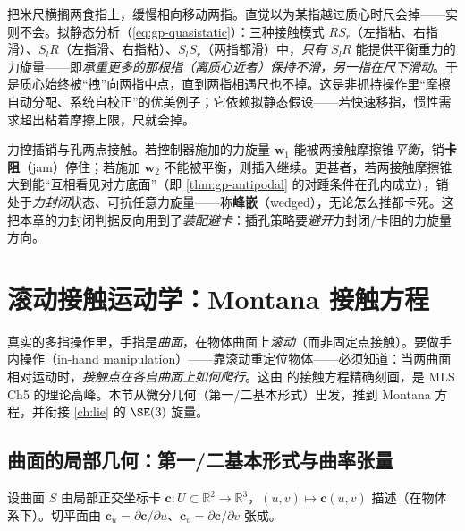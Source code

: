 \begin{example}\label{ex:gp-meterstick}
把米尺横搁两食指上，缓慢相向移动两指。直觉以为某指越过质心时尺会掉——实则不会。拟静态分析（\cref{eq:gp-quasistatic}）：三种接触模式 $RS_r$（左指粘、右指滑）、$S_lR$（左指滑、右指粘）、$S_lS_r$（两指都滑）中，\emph{只有 $S_lR$} 能提供平衡重力的力旋量——即\emph{承重更多的那根指（离质心近者）保持不滑，另一指在尺下滑动}。于是质心始终被“拽”向两指中点，直到两指相遇尺也不掉。这是非抓持操作里“摩擦自动分配、系统自校正”的优美例子；它依赖拟静态假设——若快速移指，惯性需求超出粘着摩擦上限，尺就会掉。
\end{example}

\begin{example}\label{ex:gp-wedge}
力控插销与孔两点接触。若控制器施加的力旋量 $\mathbf{w}_1$ 能被两接触摩擦锥\emph{平衡}，销\textbf{卡阻}（jam）停住；若施加 $\mathbf{w}_2$ 不能被平衡，则插入继续。更甚者，若两接触摩擦锥大到能“互相看见对方底面”（即 \cref{thm:gp-antipodal} 的对踵条件在孔内成立），销处于\emph{力封闭}状态、可抗任意力旋量——称\textbf{峰嵌}（wedged），无论怎么推都卡死。这把本章的力封闭判据反向用到了\emph{装配避卡}：插孔策略要\emph{避开}力封闭/卡阻的力旋量方向。
\end{example}

\section{滚动接触运动学：Montana 接触方程}
\label{sec:gp-rolling}

真实的多指操作里，手指是\emph{曲面}，在物体曲面上\emph{滚动}（而非固定点接触）。要做手内操作（in-hand manipulation）——靠滚动重定位物体——必须知道：当两曲面相对运动时，\emph{接触点在各自曲面上如何爬行}。这由 \citeauthor{montana1988}\cite{montana1988} 的接触方程精确刻画，是 MLS Ch5 的理论高峰\cite{murray1994mathematical}。本节从微分几何（第一/二基本形式）出发，推到 Montana 方程，并衔接 \cref{ch:lie} 的 $\SE(3)$ 旋量。

\subsection{曲面的局部几何：第一/二基本形式与曲率张量}
设曲面 $S$ 由局部正交坐标卡 $\mathbf{c}:U\subset\mathbb{R}^2\to\mathbb{R}^3$，$(u,v)\mapsto\mathbf{c}(u,v)$ 描述（在物体系下）。切平面由 $\mathbf{c}_u=\partial\mathbf{c}/\partial u$、$\mathbf{c}_v=\partial\mathbf{c}/\partial v$ 张成。


